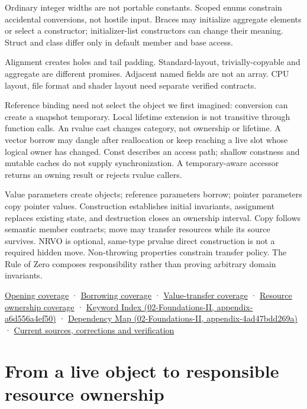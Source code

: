 Ordinary integer widths are not portable constants. Scoped enums constrain accidental conversions, not hostile input. Braces may initialize aggregate elements or select a constructor; initializer-list constructors can change their meaning. Struct and class differ only in default member and base access.

Alignment creates holes and tail padding. Standard-layout, trivially-copyable and aggregate are different promises. Adjacent named fields are not an array. CPU layout, file format and shader layout need separate verified contracts.

Reference binding need not select the object we first imagined: conversion can create a snapshot temporary. Local lifetime extension is not transitive through function calls. An rvalue cast changes category, not ownership or lifetime. A vector borrow may dangle after reallocation or keep reaching a live slot whose logical owner has changed. Const describes an access path; shallow constness and mutable caches do not supply synchronization. A temporary-aware accessor returns an owning result or rejects rvalue callers.

Value parameters create objects; reference parameters borrow; pointer parameters copy pointer values. Construction establishes initial invariants, assignment replaces existing state, and destruction closes an ownership interval. Copy follows semantic member contracts; move may transfer resources while its source survives. NRVO is optional, same-type prvalue direct construction is not a required hidden move. Non-throwing properties constrain transfer policy. The Rule of Zero composes responsibility rather than proving arbitrary domain invariants.

\hyperref[appendix-fd090d982a15-m007---parts-101-112]{Opening coverage} · \hyperref[appendix-fd090d982a15-m008---parts-113-126]{Borrowing coverage} · \hyperref[appendix-fd090d982a15-m009---parts-127-147]{Value-transfer coverage} · \hyperref[appendix-fd090d982a15-m010---parts-148-160]{Resource ownership coverage} · \href{../02-Foundations-II/main.pdf\#nameddest=appendix-a6d556a4ef50}{Keyword Index (02-Foundations-II, appendix-a6d556a4ef50)} · \href{../02-Foundations-II/main.pdf\#nameddest=appendix-4ad47bdd269a}{Dependency Map (02-Foundations-II, appendix-4ad47bdd269a)} · \hyperref[appendix-a103e7846d21-m010---resource-ownership]{Current sources, corrections and verification}

\section{From a live object to responsible resource ownership}\label{01-foundations-i-ch004-from-a-live-object-to-responsible-resource-ownership}

